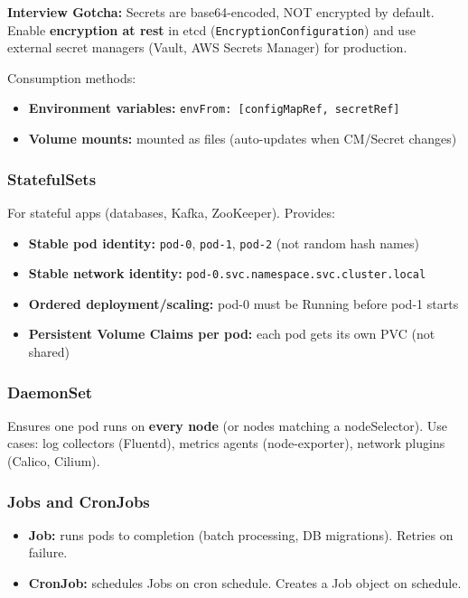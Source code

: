 \documentclass[11pt]{article}
\providecommand{\tightlist}{\setlength{\itemsep}{1pt}\setlength{\parskip}{0pt}}
\begin{document}
\textbf{Interview Gotcha:} Secrets are base64-encoded, NOT encrypted by default. Enable \textbf{encryption at rest} in etcd (\texttt{EncryptionConfiguration}) and use external secret managers (Vault, AWS Secrets Manager) for production.

Consumption methods:

\begin{itemize}
\tightlist
\item
  \textbf{Environment variables:} \texttt{envFrom:\ {[}configMapRef,\ secretRef{]}}
\item
  \textbf{Volume mounts:} mounted as files (auto-updates when CM/Secret changes)
\end{itemize}

\subsubsection{StatefulSets}\label{statefulsets}

For stateful apps (databases, Kafka, ZooKeeper). Provides:

\begin{itemize}
\tightlist
\item
  \textbf{Stable pod identity:} \texttt{pod-0}, \texttt{pod-1}, \texttt{pod-2} (not random hash names)
\item
  \textbf{Stable network identity:} \texttt{pod-0.svc.namespace.svc.cluster.local}
\item
  \textbf{Ordered deployment/scaling:} pod-0 must be Running before pod-1 starts
\item
  \textbf{Persistent Volume Claims per pod:} each pod gets its own PVC (not shared)
\end{itemize}

\subsubsection{DaemonSet}\label{daemonset}

Ensures one pod runs on \textbf{every node} (or nodes matching a nodeSelector). Use cases: log collectors (Fluentd), metrics agents (node-exporter), network plugins (Calico, Cilium).

\subsubsection{Jobs and CronJobs}\label{jobs-and-cronjobs}

\begin{itemize}
\tightlist
\item
  \textbf{Job:} runs pods to completion (batch processing, DB migrations). Retries on failure.
\item
  \textbf{CronJob:} schedules Jobs on cron schedule. Creates a Job object on schedule.
\end{itemize}
\end{document}
